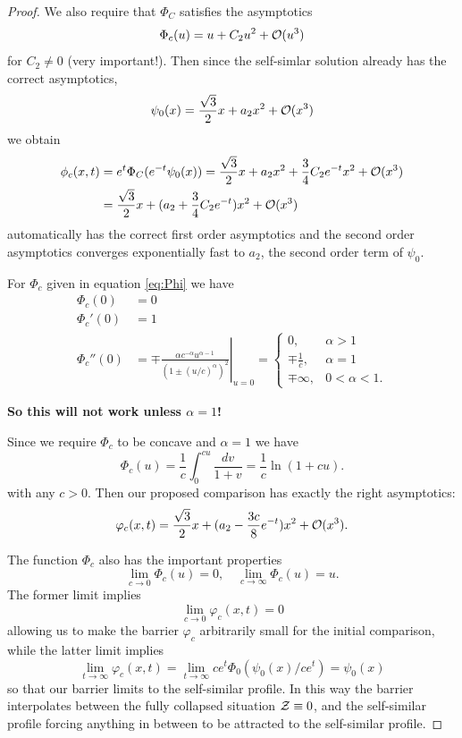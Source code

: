 \documentclass[12pt]{amsart}
\begin{document}
\begin{proof}
We also require that $\Phi_C$ satisfies the asymptotics
\begin{equation}
\label{eq:comparison_asymptotics}
\Phi_c(u) = u + C_2 u^2 + \operatorname{\mathcal{O}}(u^3)
\end{equation}
for $C_2 \ne 0$ (very important!). Then since the self-simlar solution already has the correct asymptotics,
\[
\psi_0(x) = \frac{\sqrt{3}}{2} x + a_2 x^2 + \operatorname{\mathcal{O}}(x^3)
\]
we obtain
\[
\begin{split}
\phi_c(x, t) &= e^t \Phi_C (e^{-t} \psi_0(x)) = \frac{\sqrt{3}}{2} x + a_2 x^2 + \frac{3}{4} C_2 e^{-t} x^2 + \operatorname{\mathcal{O}}(x^3) \\
& =  \frac{\sqrt{3}}{2} x + (a_2  + \frac{3}{4} C_2 e^{-t}) x^2 + \operatorname{\mathcal{O}}(x^3)
\end{split}
\]
automatically has the correct first order asymptotics and the second order asymptotics converges exponentially fast to $a_2$, the second order term of $\psi_0$.

For $\Phi_c$ given in equation \eqref{eq:Phi} we have
\begin{align*}
\Phi_c(0) &= 0 \\
\Phi_c'(0) &= 1 \\
\Phi_c''(0) &= \mp \left.\frac{\alpha c^{-\alpha} u^{\alpha-1}}{(1 \pm (u/c)^{\alpha})^2}\right|_{u=0} = \begin{cases}
0, & \alpha > 1 \\
\mp \tfrac{1}{c}, & \alpha = 1 \\
\mp \infty, &  0 < \alpha < 1.
\end{cases}
\end{align*}

\textbf{So this will not work unless $\alpha=1$!}

Since we require $\Phi_c$ to be concave and $\alpha=1$ we have
\[
\Phi_c(u) =  \frac{1}{c} \int_0^{cu} \frac{dv}{1 + v} = \frac{1}{c} \ln(1 + cu).
\]
with any $c>0$. Then our proposed comparison has exactly the right asymptotics:
\[
\varphi_c(x, t) = \frac{\sqrt{3}}{2} x + (a_2 - \frac{3c}{8} e^{-t}) x^2 + \operatorname{\mathcal{O}}(x^3).
\]

The function $\Phi_c$ also has the important properties
\[
\lim_{c\to 0} \Phi_c (u) = 0, \quad \lim_{c\to \infty} \Phi_c (u) = u.
\]
The former limit implies
\[
\lim_{c\to 0} \varphi_c (x, t) = 0
\]
allowing us to make the barrier $\varphi_c$ arbitrarily small for the initial comparison, while the latter limit implies
\[
\lim_{t\to \infty} \varphi_c(x, t) = \lim_{t\to\infty} c e^t \Phi_0(\psi_0(x)/ce^t) = \psi_0(x)
\]
so that our barrier limits to the self-similar profile. In this way the barrier interpolates between the fully collapsed situation $\operatorname{\mathcal{Z}} \equiv 0$, and the self-similar profile forcing anything in between to be attracted to the self-similar profile.
\end{proof}
\end{document}
